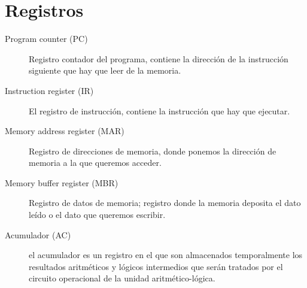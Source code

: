 \documentclass[12pt]{article}
\begin{document}
\section{Registros}
\label{sec:org8cbf87c}
\begin{description}
\item[{Program counter (PC)}] Registro contador del programa, contiene la dirección de la instrucción siguiente que hay que leer de la memoria.

\item[{Instruction register (IR)}] El registro de instrucción, contiene la instrucción que hay que ejecutar.

\item[{Memory address register (MAR)}] Registro de direcciones de memoria, donde ponemos la dirección de memoria a la que queremos acceder.

\item[{Memory buffer register (MBR)}] Registro de datos de memoria; registro donde la memoria deposita el dato leído o el dato que queremos escribir.

\item[{Acumulador (AC)}] el acumulador es un registro en el que son almacenados temporalmente los resultados aritméticos y lógicos intermedios que serán tratados por el circuito operacional de la unidad aritmético-lógica.
\end{description}

\pagebreak
\end{document}
